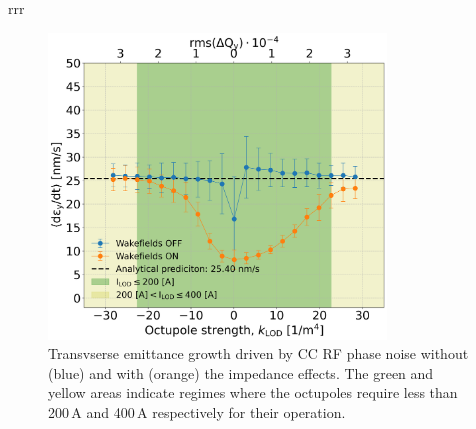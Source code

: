 rrr
\begin{figure}[!h] %
   \centering         
   \includegraphics[width=0.8\textwidth]{images/Ch8/deyRates_sps_270GeV_PN1e-8_400MHz_SPS_CC2_updatedWakes_y-plane_WakesOFF_vs_WakesON_new_QpxQpy0.5_6D_Nb5e5_intensity3e10Scan_vs_TuneSpreadvsExpectedSPS_octupole_current.png}
       \caption{Transvserse emittance growth driven by CC RF phase noise without (blue) and with (orange) the impedance effects. The green and yellow areas indicate regimes where the octupoles require less than 200\,A and 400\,A respectively for their operation.}
       \label{fig:pyheadtail_cc_impedance_2022_md_octupole_current}
\end{figure}

